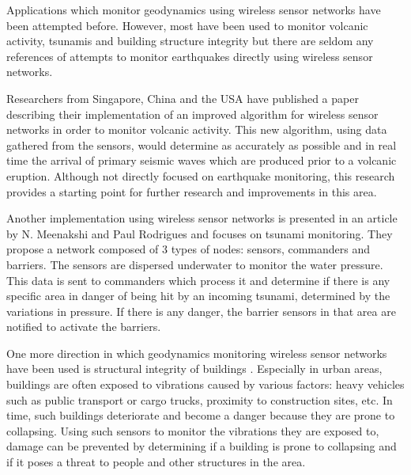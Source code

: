 Applications which monitor geodynamics using wireless sensor networks have been attempted before. However, most have been used to
monitor volcanic activity, tsunamis and building structure integrity but there are seldom any references of attempts to monitor 
earthquakes directly using wireless sensor networks.

Researchers from Singapore, China and the USA have published a paper describing their implementation of an improved algorithm 
for wireless sensor networks in order to monitor volcanic activity\cite{liu2013volcanic}. This new algorithm, using data gathered from the sensors, would determine as accurately as 
possible and in real time the arrival of primary seismic waves\cite{ben2012seismic} which are produced prior to a volcanic eruption. Although not 
directly focused on earthquake monitoring, this research provides a starting point for further research and improvements in 
this area.

Another implementation using wireless sensor networks is presented in an article by N. Meenakshi and Paul Rodrigues \cite{meenakshi2014tsunami} and focuses on tsunami monitoring.
They propose a network composed of 3 types of nodes: sensors, commanders and barriers. The sensors are dispersed underwater 
to monitor the water pressure. This data is sent to commanders which process it and determine if there is any specific area in danger 
of being hit by an incoming tsunami, determined by the variations in pressure. If there is any danger, the barrier sensors in 
that area are notified to activate the barriers.

One more direction in which geodynamics monitoring wireless sensor networks have been used is structural integrity of buildings \cite{torfs2013low}. 
Especially in urban areas, buildings are often exposed to vibrations caused by various factors: heavy vehicles such as
public transport or cargo trucks, proximity to construction sites, etc. In time, such buildings deteriorate and become a danger 
because they are prone to collapsing. Using such sensors to monitor the vibrations they are exposed to, damage can be prevented 
by determining if a building is prone to collapsing and if it poses a threat to people and other structures in the area.
